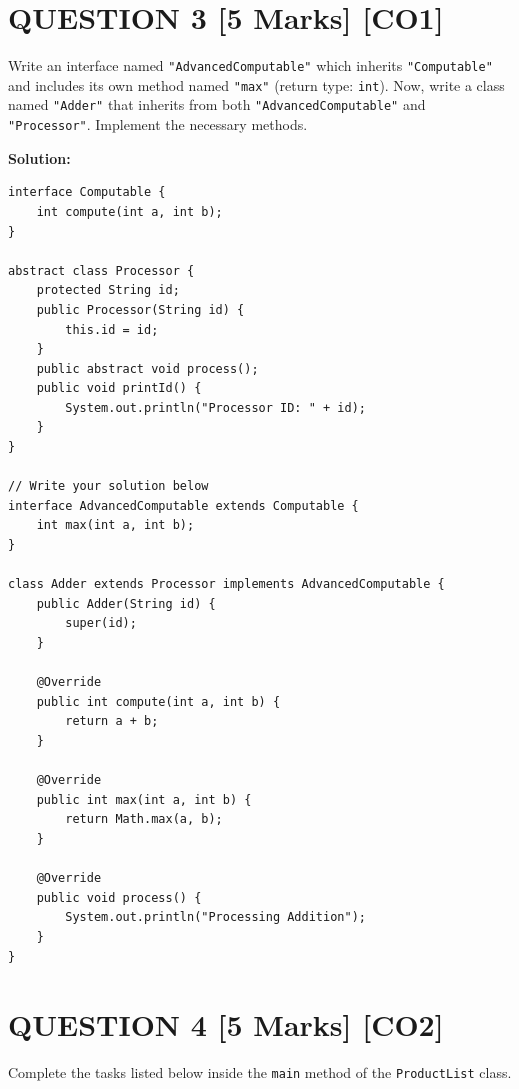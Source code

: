 \documentclass[11pt,a4paper]{article}
\begin{document}
\section*{QUESTION 3 \hfill [5 Marks] [CO1]}
Write an interface named \texttt{"AdvancedComputable"} which inherits \texttt{"Computable"} and includes its own method named \texttt{"max"} (return type: \texttt{int}). Now, write a class named \texttt{"Adder"} that inherits from both \texttt{"AdvancedComputable"} and \texttt{"Processor"}. Implement the necessary methods.

\noindent\textbf{Solution:}
\begin{lstlisting}
interface Computable {
    int compute(int a, int b);
}

abstract class Processor {
    protected String id;
    public Processor(String id) {
        this.id = id;
    }
    public abstract void process();
    public void printId() {
        System.out.println("Processor ID: " + id);
    }
}

// Write your solution below
interface AdvancedComputable extends Computable {
    int max(int a, int b);
}

class Adder extends Processor implements AdvancedComputable {
    public Adder(String id) {
        super(id);
    }

    @Override
    public int compute(int a, int b) {
        return a + b;
    }

    @Override
    public int max(int a, int b) {
        return Math.max(a, b);
    }

    @Override
    public void process() {
        System.out.println("Processing Addition");
    }
}
\end{lstlisting}
\vspace{0.6cm}

\section*{QUESTION 4 \hfill [5 Marks] [CO2]}
Complete the tasks listed below inside the \texttt{main} method of the \texttt{ProductList} class.
\end{document}
